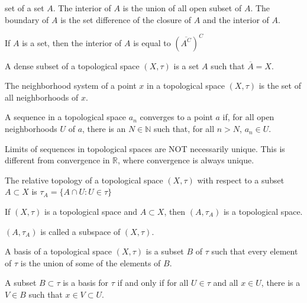     set of a set $A$. The interior of $A$
    is the union of all open subset of $A$.
    The boundary of $A$ is the set difference
    of the closure of $A$ and the interior of
    $A$.
    \begin{theorem}
        If $A$ is a set, then
        the interior of $A$ is equal to
        $(\overline{A^{C}})^{C}$
    \end{theorem}
    \begin{definition}
        A dense subset of a topological
        space $(X,\tau)$ is a set $A$
        such that $\overline{A}=X$.
    \end{definition}
    \begin{definition}
        The neighborhood system of a point
        $x$ in a topological space $(X,\tau)$
        is the set of all neighborhoods of
        $x$.
    \end{definition}
    \begin{definition}
        A sequence in a topological space
        $a_{n}$ converges to a point $a$ if,
        for all open neighborhoods $U$ of $a$,
        there is an $N\in\mathbb{N}$ such that,
        for all $n>N$, $a_{n}\in{U}$.
    \end{definition}
    Limits of sequences in topological spaces are NOT
    necessarily unique. This is different from convergence
    in $\mathbb{R}$, where convergence is always unique.
    \begin{definition}
        The relative topology of a
        topological space $(X,\tau)$ with
        respect to a subset $A\subset{X}$
        is $\tau_{A}=\{A\cap{U}:U\in\tau\}$
    \end{definition}
    \begin{theorem}
        If $(X,\tau)$ is a topological space and
        $A\subset{X}$, then
        $(A,\tau_{A})$ is a topological space.
    \end{theorem}
    $(A,\tau_{A})$ is called a subspace of
    $(X,\tau)$.
    \begin{definition}
        A basis of a topological space
        $(X,\tau)$ is a subset $B$ of
        $\tau$ such that every element
        of $\tau$ is the union of some of the
        elements of $B$.
    \end{definition}
    \begin{theorem}
        A subset $B\subset\tau$ is a basis
        for $\tau$ if and only if for all
        $U\in\tau$ and all $x\in{U}$, there is
        a $V\in{B}$ such that
        $x\in{V}\subset{U}$.
    \end{theorem}
